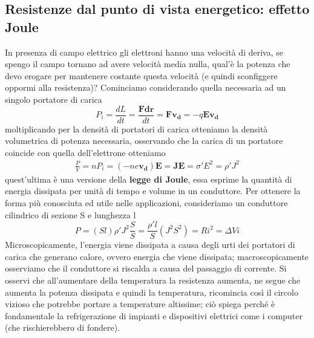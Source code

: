 \documentclass[
10pt, %
a4paper, %
oneside, %
headinclude,footinclude, %
BCOR5mm, %
]{scrartcl}
\begin{document}
\subsection{Resistenze dal punto di vista energetico: effetto Joule}
In presenza di campo elettrico gli elettroni hanno una velocità di deriva, se spengo il campo tornano ad avere velocità media nulla, qual'è la potenza che devo erogare per mantenere costante questa velocità (e quindi sconfiggere oppormi alla resistenza)? Cominciamo considerando quella necessaria ad un singolo portatore di carica
\[P_i = \frac{dL}{dt}= \frac{\mathbf{F}\mathbf{dr}}{dt}= \mathbf{F}\mathbf{v_d}= -q\mathbf{E}\mathbf{v_d}\] 
moltiplicando per la densità di portatori di carica otteniamo la densità volumetrica di potenza necessaria, osservando che la carica di un portatore coincide con quella dell'elettrone otteniamo
\begin{align}\label{eq:effetto_Joule}
	\frac{P}{V}= nP_i=  (-ne\mathbf{v_d})\mathbf{E}= \mathbf{J}\mathbf{E}= \sigma' E^2= \rho' J^2
\end{align}
quest'ultima è una versione della \textbf{legge di Joule}, essa esprime la quantità di energia dissipata per unità di tempo e volume in un conduttore. Per ottenere la forma più conosciuta ed utile nelle applicazioni, consideriamo un conduttore cilindrico di sezione S e lunghezza l
\[P = (Sl) \rho' J^2 \frac{S}{S} = \frac{\rho' l}{S}(J^2 S^2)= Ri^2= \Delta V i \]
Microscopicamente, l'energia viene dissipata a causa degli urti dei portatori di carica che generano calore, ovvero energia che viene dissipata; macroscopicamente osserviamo che il conduttore si riscalda a causa del passaggio di corrente. Si osservi che all'aumentare della temperatura la resistenza aumenta, ne segue che aumenta la potenza dissipata e quindi la temperatura, ricomincia così il circolo vizioso che potrebbe portare a temperature altissime; ciò spiega perché è fondamentale la refrigerazione di impianti e dispositivi elettrici come i computer (che rischierebbero di fondere).    
\end{document}
